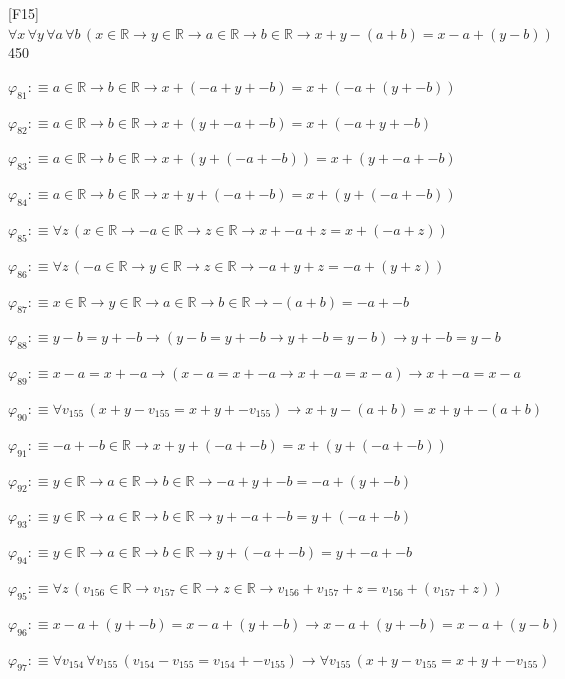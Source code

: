 \begin{fullproof}{[F15]}{$\forall x\,\forall y\,\forall a\,\forall b\,(x \in \mathbb{R} \to y \in \mathbb{R} \to a \in \mathbb{R} \to b \in \mathbb{R} \to x + y - (a + b) = x - a + (y - b))$}{450}
\begin{abbrevlist}
\item $\varphi_{81} :\equiv a \in \mathbb{R} \to b \in \mathbb{R} \to x + (-a + y + -b) = x + (-a + (y + -b))$
\item $\varphi_{82} :\equiv a \in \mathbb{R} \to b \in \mathbb{R} \to x + (y + -a + -b) = x + (-a + y + -b)$
\item $\varphi_{83} :\equiv a \in \mathbb{R} \to b \in \mathbb{R} \to x + (y + (-a + -b)) = x + (y + -a + -b)$
\item $\varphi_{84} :\equiv a \in \mathbb{R} \to b \in \mathbb{R} \to x + y + (-a + -b) = x + (y + (-a + -b))$
\item $\varphi_{85} :\equiv \forall z\,(x \in \mathbb{R} \to -a \in \mathbb{R} \to z \in \mathbb{R} \to x + -a + z = x + (-a + z))$
\item $\varphi_{86} :\equiv \forall z\,(-a \in \mathbb{R} \to y \in \mathbb{R} \to z \in \mathbb{R} \to -a + y + z = -a + (y + z))$
\item $\varphi_{87} :\equiv x \in \mathbb{R} \to y \in \mathbb{R} \to a \in \mathbb{R} \to b \in \mathbb{R} \to -(a + b) = -a + -b$
\item $\varphi_{88} :\equiv y - b = y + -b \to (y - b = y + -b \to y + -b = y - b) \to y + -b = y - b$
\item $\varphi_{89} :\equiv x - a = x + -a \to (x - a = x + -a \to x + -a = x - a) \to x + -a = x - a$
\item $\varphi_{90} :\equiv \forall v_{155}\,(x + y - v_{155} = x + y + -v_{155}) \to x + y - (a + b) = x + y + -(a + b)$
\item $\varphi_{91} :\equiv -a + -b \in \mathbb{R} \to x + y + (-a + -b) = x + (y + (-a + -b))$
\item $\varphi_{92} :\equiv y \in \mathbb{R} \to a \in \mathbb{R} \to b \in \mathbb{R} \to -a + y + -b = -a + (y + -b)$
\item $\varphi_{93} :\equiv y \in \mathbb{R} \to a \in \mathbb{R} \to b \in \mathbb{R} \to y + -a + -b = y + (-a + -b)$
\item $\varphi_{94} :\equiv y \in \mathbb{R} \to a \in \mathbb{R} \to b \in \mathbb{R} \to y + (-a + -b) = y + -a + -b$
\item $\varphi_{95} :\equiv \forall z\,(v_{156} \in \mathbb{R} \to v_{157} \in \mathbb{R} \to z \in \mathbb{R} \to v_{156} + v_{157} + z = v_{156} + (v_{157} + z))$
\item $\varphi_{96} :\equiv x - a + (y + -b) = x - a + (y + -b) \to x - a + (y + -b) = x - a + (y - b)$
\item $\varphi_{97} :\equiv \forall v_{154}\,\forall v_{155}\,(v_{154} - v_{155} = v_{154} + -v_{155}) \to \forall v_{155}\,(x + y - v_{155} = x + y + -v_{155})$

\end{abbrevlist}
\end{fullproof}
